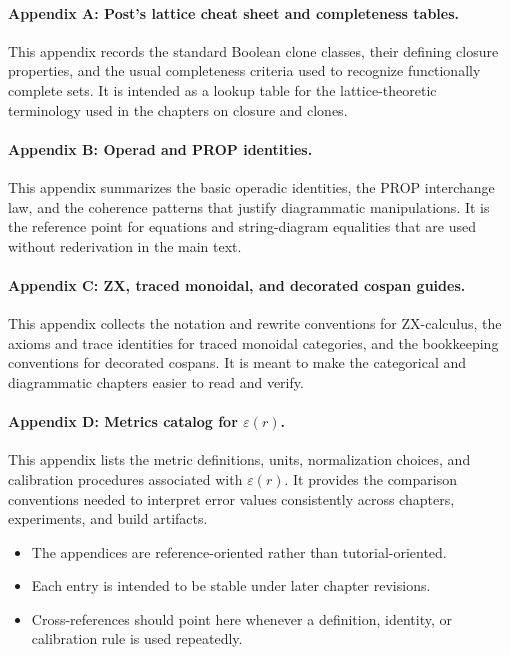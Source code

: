 \paragraph{Appendix A: Post's lattice cheat sheet and completeness tables.} This appendix records the standard Boolean clone classes, their defining closure properties, and the usual completeness criteria used to recognize functionally complete sets. It is intended as a lookup table for the lattice-theoretic terminology used in the chapters on closure and clones.

\paragraph{Appendix B: Operad and PROP identities.} This appendix summarizes the basic operadic identities, the PROP interchange law, and the coherence patterns that justify diagrammatic manipulations. It is the reference point for equations and string-diagram equalities that are used without rederivation in the main text.

\paragraph{Appendix C: ZX, traced monoidal, and decorated cospan guides.} This appendix collects the notation and rewrite conventions for ZX-calculus, the axioms and trace identities for traced monoidal categories, and the bookkeeping conventions for decorated cospans. It is meant to make the categorical and diagrammatic chapters easier to read and verify.

\paragraph{Appendix D: Metrics catalog for $\varepsilon(r)$.} This appendix lists the metric definitions, units, normalization choices, and calibration procedures associated with $\varepsilon(r)$. It provides the comparison conventions needed to interpret error values consistently across chapters, experiments, and build artifacts.

\begin{itemize}
  \item The appendices are reference-oriented rather than tutorial-oriented.
  \item Each entry is intended to be stable under later chapter revisions.
  \item Cross-references should point here whenever a definition, identity, or calibration rule is used repeatedly.
\end{itemize}

